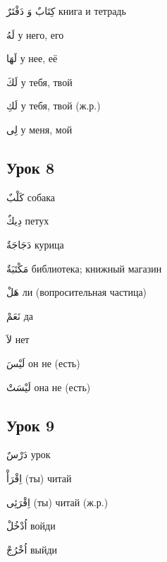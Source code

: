\documentclass[a5paper]{article}
\newcommand\textstyleDropCaps[1]{#1}
\newcommand\textstyleCaptioncharacters[1]{#1}
\begin{document}
\textstyleCaptioncharacters{كِتَابٌ وَ دَفْتَرٌ }\textstyleDropCaps{книга и тетрадь‎}

\textstyleCaptioncharacters{لَهُ }\textstyleDropCaps{у него, его‎}

\textstyleCaptioncharacters{لَهَا }\textstyleDropCaps{у нее, её‎}

\textstyleCaptioncharacters{لَكَ }\textstyleDropCaps{у тебя, твой‎}

\textstyleCaptioncharacters{لَكِ }\textstyleDropCaps{у тебя, твой (ж.р.)‎}

\textstyleCaptioncharacters{لِى }\textstyleDropCaps{у меня, мой‎}

\subsection[Урок 8‎]{\textstyleDropCaps{Урок 8‎}}
\textstyleCaptioncharacters{كَلْبٌ }\textstyleDropCaps{собака‎}

\textstyleCaptioncharacters{دِيكٌ }\textstyleDropCaps{петух‎}

\textstyleCaptioncharacters{دَجَاجَةٌ }\textstyleDropCaps{курица‎}

\textstyleCaptioncharacters{مَكْتَبَةٌ }\textstyleDropCaps{библиотека; книж­ный магазин‎}

\textstyleCaptioncharacters{هَلْ }\textstyleDropCaps{ли (вопросительная ча­стица)‎}

\textstyleCaptioncharacters{نَعَمْ }\textstyleDropCaps{да‎}

\textstyleCaptioncharacters{لاَ }\textstyleDropCaps{нет‎}

\textstyleCaptioncharacters{لَيْسَ }\textstyleDropCaps{он не (есть)‎}

\textstyleCaptioncharacters{لَيْسَتْ }\textstyleDropCaps{она не (есть)‎}

\subsection[Урок 9‎]{\textstyleDropCaps{Урок 9‎}}
\textstyleCaptioncharacters{دَرْسٌ }\textstyleDropCaps{урок‎}

\textstyleCaptioncharacters{اِقْرَأْ }\textstyleDropCaps{(ты) читай‎}

\textstyleCaptioncharacters{اِقْرَئِى }\textstyleDropCaps{(ты) читай (ж.р.)‎}

\textstyleCaptioncharacters{اُدْخُلْ }\textstyleDropCaps{войди‎}

\textstyleCaptioncharacters{اُخْرُجْ }\textstyleDropCaps{выйди‎}
\end{document}
